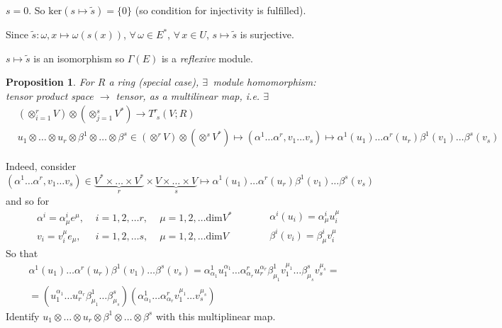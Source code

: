 \documentclass[10pt]{amsart}
\newtheorem{proposition}{Proposition}
\begin{document}
\begin{multicols*}{2}
$s=0$.  So $\text{ker}(s\mapsto \widetilde{s}) = \lbrace 0 \rbrace$ (so condition for injectivity is fulfilled).  

Since $\widetilde{s}:\omega,x\mapsto \omega(s(x))$, $\forall \, \omega \in E^*$, $\forall \, x \in U$, $s\mapsto \widetilde{s}$ is surjective.  

$s\mapsto \widetilde{s}$ is an isomorphism so $\Gamma(E)$ is a \emph{reflexive} module.  


\begin{proposition}
For $R$ a ring (special case), $\exists \, $ module homomorphism:  \\

tensor product space $\to $ tensor, as a multilinear map, i.e. $\exists$ \,  
\begin{equation}
\begin{aligned}
&	\left( \otimes_{i=1}^r V \right) \otimes \left( \otimes_{j=1}^s V^* \right) \to T^r_{ \, \, s}(V;R)   \\
& u_1 \otimes \dots \otimes u_r \otimes \beta^1 \otimes \dots \otimes \beta^s \in \left( \otimes^r V \right) \otimes \left( \otimes^s V^* \right) \mapsto (\alpha^1 \dots \alpha^r, v_1 \dots v_s) \mapsto \alpha^1(u_1) \dots \alpha^r(u_r) \beta^1(v_1) \dots \beta^s(v_s)  
\end{aligned}
\end{equation}
\end{proposition}

Indeed, consider 
\[
(\alpha^1 \dots \alpha^r, v_1 \dots v_s) \in \underbrace{V^* \times \dots \times V^* }_{r} \times \underbrace{ V\times \dots \times V}_{s} \mapsto \alpha^1(u_1) \dots \alpha^r(u_r) \beta^1(v_1) \dots \beta^s(v_s)
\]
and so for 
\[
\begin{aligned}
	& \alpha^i = \alpha^i_{\mu} e^{\mu} , \, & \, i =1,2, \dots r, \, & \, \mu = 1,2, \dots \text{dim}V^* \\ 
	& v_i = v_i^{\mu} e_{\mu} , \, & \, i = 1,2, \dots s, \, & \, \mu = 1, 2, \dots \text{dim}V 
\end{aligned} \qquad \, \begin{aligned}
& \alpha^i(u_i) = \alpha^i_{\mu} u^{\mu}_i \\ 
 & \beta^i(v_i) = \beta^i_{\mu} v^{\mu}_i
\end{aligned}
\]
So that 
\[
\begin{gathered}
	\alpha^1(u_1) \dots \alpha^r(u_r) \beta^1(v_1) \dots \beta^s(v_s) = \alpha^1_{\alpha_1}u^{\alpha_1}_1 \dots \alpha^r_{\alpha_r} u^{\alpha_r}_r \beta^1_{\mu_1} v^{\mu_1}_1 \dots \beta^s_{\mu_s} v^{\mu_s}_s = \\
	= (u^{\alpha_1}_1 \dots u_r^{\alpha_r} \beta^1_{\mu_1} \dots \beta^s_{\mu_s})(\alpha^1_{\alpha_1} \dots \alpha^r_{\alpha_r} v_1^{\mu_1} \dots v_s^{\mu_s} )
\end{gathered}
\]
Identify $u_1 \otimes \dots \otimes u_r \otimes \beta^1 \otimes \dots \otimes \beta^s$ with this multiplinear map.  


\end{multicols*}
\end{document}
